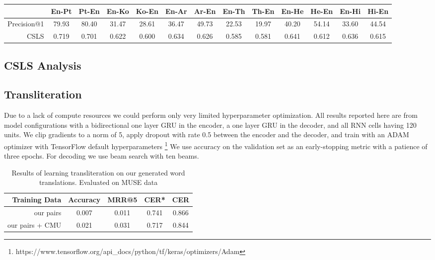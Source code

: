 \documentclass{article}
\begin{document}
\begin{table}
  \centering
  \tabcolsep=0.07cm
  \begin{tabular}{||r|cc|cc|cc|cc|cc|cc||}
    \hline
    & En-Pt & Pt-En & En-Ko & Ko-En & En-Ar & Ar-En & En-Th & Th-En
    & En-He & He-En & En-Hi & Hi-En \\
    \hline
    Precision@1 & 79.93 & 80.40 & 31.47 & 28.61 & 36.47 & 49.73 & 22.53 & 19.97
      & 40.20 & 54.14 & 33.60 & 44.54 \\
    CSLS        & 0.719 & 0.701 & 0.622 & 0.600 & 0.634 & 0.626 & 0.585 & 0.581
      & 0.641 & 0.612 & 0.636 & 0.615 \\
    \hline
  \end{tabular}
\end{table}

\subsection*{CSLS Analysis}

\subsection*{Transliteration}

Due to a lack of compute resources we could perform
only very limited hyperparameter optimization.
All results reported here are from model configurations
with a bidirectional one layer GRU in the encoder,
a one layer GRU in the decoder,
and all RNN cells having 120 units.
We clip gradients to a norm of 5,
apply dropout with rate 0.5 between the encoder and the decoder,
and train with an ADAM optimizer with TensorFlow default hyperparameters
\footnote{https://www.tensorflow.org/api\_docs/python/tf/keras/optimizers/Adam}
We use accuracy on the validation set as an early-stopping metric
with a patience of three epochs.
For decoding we use beam search with ten beams.

\begin{table}[h]
  \centering
  \begin{tabular}{r | c c c c}
    Training Data & Accuracy & MRR@5 & CER* & CER \\
    \hline
    our pairs & 0.007 & 0.011 & 0.741 & 0.866 \\
    our pairs + CMU & 0.021 & 0.031 & 0.717 & 0.844 \\
  \end{tabular}
  \caption{Results of learning transliteration on our generated word
    translations. Evaluated on MUSE data}
  \label{tab:our-muse}
\end{table}
\end{document}
